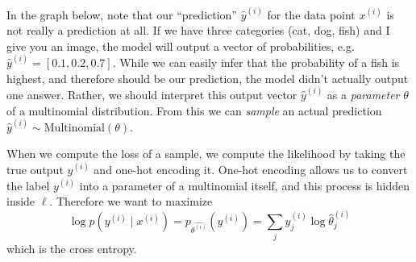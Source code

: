   \begin{example}[Softmax]
    In the graph below, note that our ``prediction'' $\hat{y}^{(i)}$ for the data point $x^{(i)}$ is not really a prediction at all. If we have three categories (cat, dog, fish) and I give you an image, the model will output a vector of probabilities, e.g. $\hat{y}^{(i)} = [0.1, 0.2, 0.7]$. While we can easily infer that the probability of a fish is highest, and therefore should be our prediction, the model didn't actually output one answer. Rather, we should interpret this output vector $\hat{y}^{(i)}$ as a \textit{parameter} $\theta$ of a multinomial distribution. From this we can \textit{sample} an actual prediction $\hat{y}^{(i)} \sim \mathrm{Multinomial}(\theta)$. 

    When we compute the loss of a sample, we compute the likelihood by taking the true output $y^{(i)}$ and one-hot encoding it. One-hot encoding allows us to convert the label $y^{(i)}$ into a parameter of a multinomial itself, and this process is hidden inside $\ell$. Therefore we want to maximize
    \begin{equation}
      \log p(y^{(i)} \mid x^{(i)}) = p_{\hat{\theta^{(i)}}} (y^{(i)}) = \sum_j y_j^{(i)} \log  \hat{\theta}^{(i)}_j 
    \end{equation}
    which is the cross entropy. 

    \begin{figure}[H]
      \centering
      \begin{tikzpicture}[x=0.75pt,y=0.75pt,yscale=-1,xscale=1]


\end{tikzpicture}
\end{figure}
\end{example}

